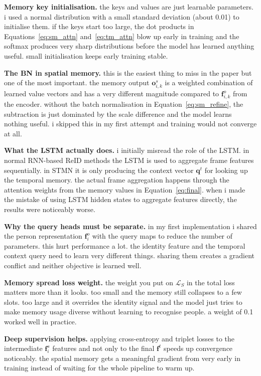 \documentclass[conference]{IEEEtran}
\begin{document}
\textbf{Memory key initialisation.} the keys and values are just learnable parameters. i used a normal distribution with a small standard deviation (about 0.01) to initialise them. if the keys start too large, the dot products in Equations~\ref{eq:sm_attn} and~\ref{eq:tm_attn} blow up early in training and the softmax produces very sharp distributions before the model has learned anything useful. small initialisation keeps early training stable.

\textbf{The BN in spatial memory.} this is the easiest thing to miss in the paper but one of the most important. the memory output $\mathbf{o}^s_{i,k}$ is a weighted combination of learned value vectors and has a very different magnitude compared to $\mathbf{f}^o_{i,k}$ from the encoder. without the batch normalisation in Equation~\ref{eq:sm_refine}, the subtraction is just dominated by the scale difference and the model learns nothing useful. i skipped this in my first attempt and training would not converge at all.

\textbf{What the LSTM actually does.} i initially misread the role of the LSTM. in normal RNN-based ReID methods the LSTM is used to aggregate frame features sequentially. in STMN it is only producing the context vector $\mathbf{q}^t$ for looking up the temporal memory. the actual frame aggregation happens through the attention weights from the memory values in Equation~\ref{eq:final}. when i made the mistake of using LSTM hidden states to aggregate features directly, the results were noticeably worse.

\textbf{Why the query heads must be separate.} in my first implementation i shared the person representation $\mathbf{f}^o_i$ with the query maps to reduce the number of parameters. this hurt performance a lot. the identity feature and the temporal context query need to learn very different things. sharing them creates a gradient conflict and neither objective is learned well.

\textbf{Memory spread loss weight.} the weight you put on $\mathcal{L}_S$ in the total loss matters more than it looks. too small and the memory still collapses to a few slots. too large and it overrides the identity signal and the model just tries to make memory usage diverse without learning to recognise people. a weight of 0.1 worked well in practice.

\textbf{Deep supervision helps.} applying cross-entropy and triplet losses to the intermediate $\mathbf{f}^s_i$ features and not only to the final $\mathbf{f}^t$ speeds up convergence noticeably. the spatial memory gets a meaningful gradient from very early in training instead of waiting for the whole pipeline to warm up.
\end{document}

